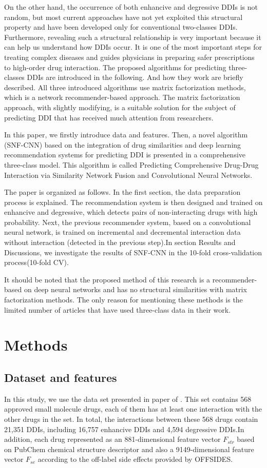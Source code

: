 \documentclass{bmcart}
\begin{document}
On the other hand, the occurrence of both enhancive and degressive DDIs is not random, but most current approaches have not yet exploited this structural property and have been developed only for conventional two-classes DDIs. Furthermore, revealing such a structural relationship is very important because it can help us understand how DDIs occur. It is one of the most important steps for treating complex diseases and guides physicians in preparing safer prescriptions to high-order drug interaction. The proposed algorithms for predicting three-classes DDIs are introduced in the following. And how they work are briefly described. All three introduced algorithms use matrix factorization methods, which is a network recommender-based approach. The matrix factorization approach, with slightly modifying, is a suitable solution for the subject of predicting DDI that has received much attention from researchers.

In this paper, we firstly introduce data and features. Then, a novel algorithm (SNF-CNN) based on the integration of drug similarities and deep learning recommendation systems for predicting DDI is presented in a comprehensive three-class model. This algorithm is called Predicting Comprehensive Drug-Drug Interaction via Similarity Network Fusion and Convolutional Neural Networks.

The paper is organized as follows. In the first section, the data preparation process is explained. The recommendation system is then designed and trained on enhancive and degressive, which detects pairs of non-interacting drugs with high probability. Next, the previous recommender system, based on a convolutional neural network, is trained on incremental and decremental interaction data without interaction (detected in the previous step).In section Results and Discussions, we investigate the results of SNF-CNN in the 10-fold cross-validation process(10-fold CV).

It should be noted that the proposed method of this research is a recommender-based on deep neural networks and has no structural similarities with matrix factorization methods. The only reason for mentioning these methods is the limited number of articles that have used three-class data in their work.

\section*{Methods}
\subsection*{Dataset and features}
In this study, we use the data set presented in paper of \cite{yu2018predicting}. This set contains 568 approved small molecule drugs, each of them has at least one interaction with the other drugs in the set. In total, the interactions between these 568 drugs contain 21,351 DDIs, including 16,757 enhancive DDIs and 4,594 degressive DDIs.In addition, each drug represented as an  881-dimensional feature vector $ F_ {str} $  based on PubChem chemical structure descriptor and also a 9149-dimensional feature vector $ F_ {se} $ according to the off-label side effects provided by OFFSIDES.
\end{document}
